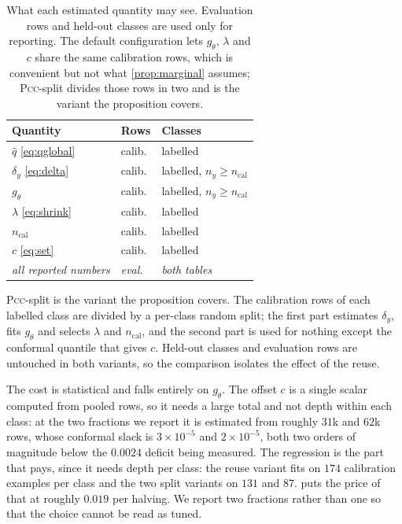 \begin{table}[h]
\centering
\small
\setlength{\tabcolsep}{3pt}
\begin{tabular}{@{}lll@{}}
\toprule
Quantity & Rows & Classes \\
\midrule
$\hat q$ \eqref{eq:qglobal}      & calib. & labelled \\
$\delta_y$ \eqref{eq:delta}      & calib. & labelled, $n_y\ge n_{\mathrm{cal}}$ \\
$g_\theta$                       & calib. & labelled, $n_y\ge n_{\mathrm{cal}}$ \\
$\lambda$ \eqref{eq:shrink}      & calib. & labelled \\
$n_{\mathrm{cal}}$               & calib. & labelled \\
$c$ \eqref{eq:set}               & calib. & labelled \\
\midrule
\emph{all reported numbers}      & \emph{eval.} & \emph{both tables} \\
\bottomrule
\end{tabular}
\caption{What each estimated quantity may see. Evaluation rows and held-out classes are used
only for reporting. The default configuration lets $g_\theta$, $\lambda$ and $c$ share the same
calibration rows, which is convenient but not what \cref{prop:marginal} assumes; \textsc{Pcc}-split
divides those rows in two and is the variant the proposition covers.}
\label{tab:splits}
\end{table}

\textsc{Pcc}-split is the variant the proposition covers. The calibration rows of each labelled
class are divided by a per-class random split; the first part estimates $\delta_y$, fits
$g_\theta$ and selects $\lambda$ and $n_{\mathrm{cal}}$, and the second part is used for nothing
except the conformal quantile that gives $c$. Held-out classes and evaluation rows are untouched
in both variants, so the comparison isolates the effect of the reuse.

The cost is statistical and falls entirely on $g_\theta$. The offset $c$ is a single scalar
computed from pooled rows, so it needs a large total and not depth within each class: at the
two fractions we report it is estimated from roughly $31$k and $62$k rows, whose conformal
slack is $3\times10^{-5}$ and $2\times10^{-5}$, both two orders of magnitude below the
$0.0024$ deficit being measured. The regression is the part that pays, since it needs depth
per class: the reuse variant fits on $174$ calibration examples per class and the two split
variants on $131$ and $87$.  puts the price of that at roughly $0.019$ per
halving. We report two fractions rather than one so that the choice cannot be read as tuned.

